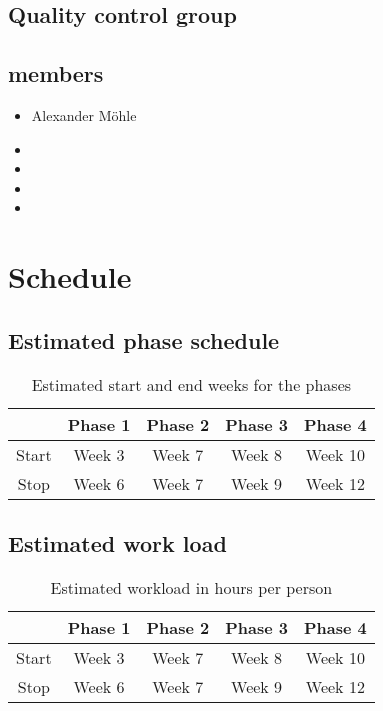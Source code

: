 \documentclass{article}
\begin{document}
    \subsection{Quality control group}
        \subsection{members}
            \begin{itemize}
                \item Alexander Möhle
                \item
                \item
                \item
                \item
            \end{itemize}

\newpage
\section{Schedule}
    \subsection{Estimated phase schedule}
        \begin{table}[h]
            \centering
            \begin{tabular}{|c|c|c|c|c|}
                \hline
                            & Phase 1 & Phase 2 & Phase 3 & Phase 4 \\
                 \hline
                 Start      & Week 3  & Week 7  & Week 8  & Week 10  \\
                 \hline
                 Stop       & Week 6  & Week 7  & Week 9  & Week 12  \\
                 \hline
            \end{tabular}
            \caption{Estimated start and end weeks for the phases}
        \end{table}
    
    \subsection{Estimated work load}
        \begin{table}[h]
            \centering
            \begin{tabular}{|c|c|c|c|c|}
                \hline
                            & Phase 1 & Phase 2 & Phase 3 & Phase 4 \\
                 \hline
                 Start      & Week 3  & Week 7  & Week 8  & Week 10  \\
                 \hline
                 Stop       & Week 6  & Week 7  & Week 9  & Week 12  \\
                 \hline
            \end{tabular}
            \caption{Estimated workload in hours per person}
        \end{table}
        
\end{document}
